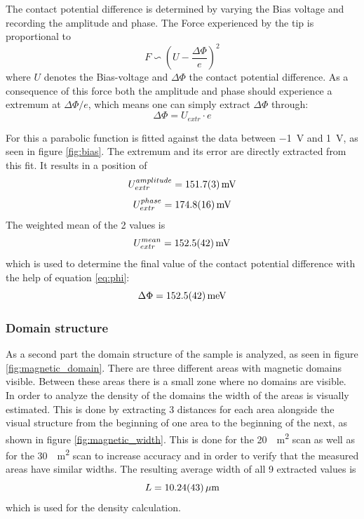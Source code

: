 \documentclass[%
 reprint,
amsmath,amssymb,
pra,
]{revtex4-1}
\begin{document}
The contact potential difference is determined by varying the Bias voltage and recording the amplitude and phase. The Force experienced by the tip is proportional to
\begin{equation}
F \backsim \left(U-\dfrac{\Delta\Phi}{e}\right)^2
\end{equation}
where $U$ denotes the Bias-voltage and $\Delta\Phi$ the contact potential difference. As a consequence of this force both the amplitude and phase should experience a extremum at $\Delta\Phi / e$, which means one can simply extract $\Delta\Phi$ through:
\begin{equation}
\Delta\Phi = U_{extr} \cdot e
\label{eq:phi}
\end{equation}

For this a parabolic function is fitted against the data between \SI{-1}{V} and \SI{1}{V}, as seen in figure \ref{fig:bias}. The extremum and its error are directly extracted from this fit. It results in a position of
\begin{equation*}
U_{extr}^{amplitude} = \SI{151.7 \pm 0.3}{mV}
\end{equation*}
\begin{equation*}
U_{extr}^{phase} = \SI{174.8 \pm 1.6}{mV}
\end{equation*}
The weighted mean of the 2 values is
\begin{equation*}
U_{extr}^{mean} = \SI{152.5 \pm 4.2}{mV}
\end{equation*}
which is used to determine the final value of the contact potential difference with the help of equation \ref{eq:phi}:
\begin{equation*}
\Delta\Phi = \SI{152.5 \pm 4.2}{meV}
\end{equation*}

\subsubsection{Domain structure}
As a second part the domain structure of the sample is analyzed, as seen in figure \ref{fig:magnetic_domain}. There are three different areas with magnetic domains visible. Between these areas there is a small zone where no domains are visible.\\
In order to analyze the density of the domains the width of the areas is visually estimated. This is done by extracting 3 distances for each area alongside the visual structure from the beginning of one area to the beginning of the next, as shown in figure \ref{fig:magnetic_width}. 
This is done for the \SI{20}{\mu m^2} scan as well as for the \SI{30}{\mu m^2} scan to increase accuracy and in order to verify that the measured areas have similar widths. The resulting average width of all 9 extracted values is
\begin{equation}
L = \SI{10.24 \pm 0.43}{\mu m}
\end{equation}
which is used for the density calculation.
\end{document}
